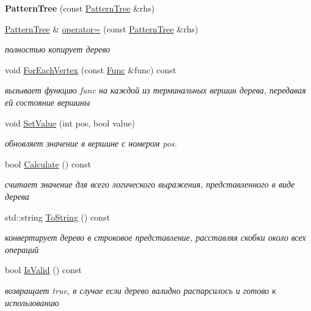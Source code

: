 \begin{DoxyCompactItemize}
\item 
{\bfseries Pattern\+Tree} (const \hyperlink{classtarget__parser_1_1PatternTree}{Pattern\+Tree} \&rhs)\hypertarget{classtarget__parser_1_1PatternTree_a2de6f22b3c103c7d6e8ab42d3208ad44}{}\label{classtarget__parser_1_1PatternTree_a2de6f22b3c103c7d6e8ab42d3208ad44}

\item 
\hyperlink{classtarget__parser_1_1PatternTree}{Pattern\+Tree} \& \hyperlink{classtarget__parser_1_1PatternTree_a52d2823b79a76e29e9ddd8d6cadba634}{operator=} (const \hyperlink{classtarget__parser_1_1PatternTree}{Pattern\+Tree} \&rhs)\hypertarget{classtarget__parser_1_1PatternTree_a52d2823b79a76e29e9ddd8d6cadba634}{}\label{classtarget__parser_1_1PatternTree_a52d2823b79a76e29e9ddd8d6cadba634}

\begin{DoxyCompactList}\small\item\em полностью копирует дерево \end{DoxyCompactList}\item 
void \hyperlink{classtarget__parser_1_1PatternTree_a851ee4b1279c2dcfc4557cab03f8aa83}{For\+Each\+Vertex} (const \hyperlink{namespacetarget__parser_aa28dbbced739f360834455cbffeaa6e4}{Func} \&func) const 
\begin{DoxyCompactList}\small\item\em вызывает функцию func на каждой из терминальных вершин дерева, передавая ей состояние вершины \end{DoxyCompactList}\item 
void \hyperlink{classtarget__parser_1_1PatternTree_a931c01fcdabeedc5b6bdf651c544b1ab}{Set\+Value} (int pos, bool value)
\begin{DoxyCompactList}\small\item\em обновляет значение в вершине с номером pos. \end{DoxyCompactList}\item 
bool \hyperlink{classtarget__parser_1_1PatternTree_afb6cc7464f4df5eca028edfb6fd6d222}{Calculate} () const 
\begin{DoxyCompactList}\small\item\em считает значение для всего логического выражения, представленного в виде дерева \end{DoxyCompactList}\item 
std\+::string \hyperlink{classtarget__parser_1_1PatternTree_ab73d10f856192a4e6147c06c383302d1}{To\+String} () const 
\begin{DoxyCompactList}\small\item\em конвертирует дерево в строковое представление, расставляя скобки около всех операций \end{DoxyCompactList}\item 
bool \hyperlink{classtarget__parser_1_1PatternTree_a4732f8e97b9e85e7072b21b4e0cb6bbd}{Is\+Valid} () const 
\begin{DoxyCompactList}\small\item\em возвращает true, в случае если дерево валидно распарсилось и готово к использованию \end{DoxyCompactList}\end{DoxyCompactItemize}
